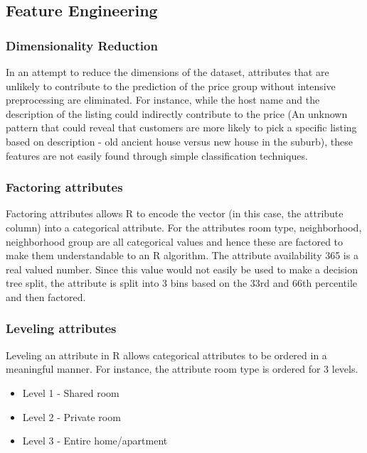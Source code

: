 \documentclass{sig-alternate}
\begin{document}
	\subsection{Feature Engineering} 
	\subsubsection{Dimensionality Reduction}
	In an attempt to reduce the dimensions of the dataset, attributes that are unlikely to contribute to the prediction of the price group without intensive preprocessing are eliminated. For instance, while the host name and the description of the listing could indirectly contribute to the price (An unknown pattern that could reveal that customers are more likely to pick a specific listing based on description - old ancient house versus new house in the suburb), these features are not easily found through simple classification techniques. 
	\subsubsection{Factoring attributes}
	Factoring attributes allows R to encode the vector (in this case, the attribute column) into a categorical attribute. For the attributes room type, neighborhood, neighborhood group are all categorical values and hence these are factored to make them understandable to an R algorithm. The attribute availability 365 is a real valued number. Since this value would not easily be used to make a decision tree split, the attribute is split into 3 bins based on the 33rd and 66th percentile and then factored.  
	\subsubsection{Leveling attributes}
	Leveling an attribute in R allows categorical attributes to be ordered in a meaningful manner. For instance, the attribute room type is ordered for 3 levels.
	\begin{itemize}
		\item Level 1 - Shared room
		\item Level 2 - Private room
		\item Level 3 - Entire home/apartment
	\end{itemize}
	
\end{document}
